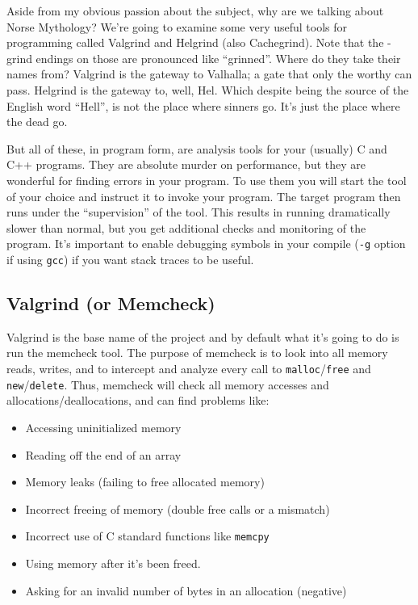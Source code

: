 \documentclass[a4paper]{report}
\begin{document}
Aside from my obvious passion about the subject, why are we talking about Norse Mythology? We're going to examine some very useful tools for programming called Valgrind and Helgrind (also Cachegrind). Note that the -grind endings on those are pronounced like ``grinned''. Where do they take their names from? Valgrind is the gateway to Valhalla; a gate that only the worthy can pass. Helgrind is the gateway to, well, Hel. Which despite being the source of the English word ``Hell'', is not the place where sinners go. It's just the place where the dead go.

But all of these, in program form, are analysis tools for your (usually) C and C++ programs. They are absolute murder on performance, but they are wonderful for finding errors in your program. To use them you will start the tool of your choice and instruct it to invoke your program. The target program then runs under the ``supervision'' of the tool. This results in running dramatically slower than normal, but you get additional checks and monitoring of the program. It's important to enable debugging symbols in your compile (\texttt{-g} option if using \texttt{gcc}) if you want stack traces to be useful.


\subsection*{Valgrind (or Memcheck) }
Valgrind is the base name of the project and by default what it's going to do is run the memcheck tool. The purpose of memcheck is to look into all memory reads, writes, and to intercept and analyze every call to \texttt{malloc}/\texttt{free} and \texttt{new}/\texttt{delete}. Thus, memcheck will check all memory accesses and allocations/deallocations, and can find problems like:
\begin{itemize}
	\item Accessing uninitialized memory
	\item Reading off the end of an array
	\item Memory leaks (failing to free allocated memory)
	\item Incorrect freeing of memory (double free calls or a mismatch)
	\item Incorrect use of C standard functions like \texttt{memcpy}
	\item Using memory after it's been freed.
	\item Asking for an invalid number of bytes in an allocation (negative\textinterrobang)
\end{itemize}
\end{document}
